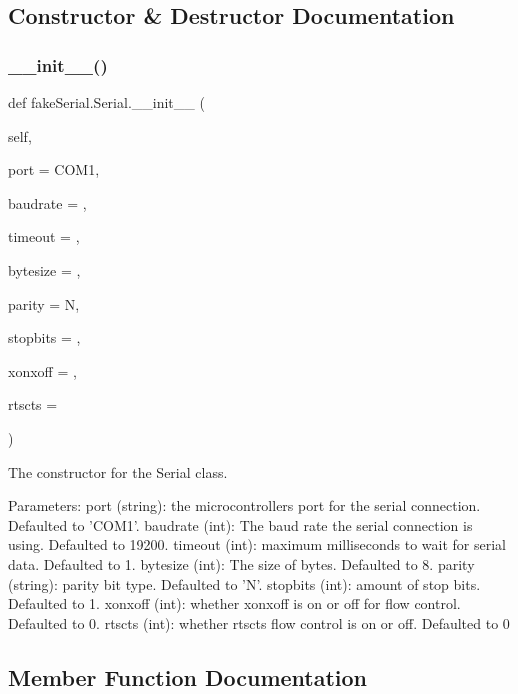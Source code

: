 \subsection{Constructor \& Destructor Documentation}
\mbox{\label{classfake_serial_1_1_serial_abcf3b27b5edb193420574f383ff1603c}} 
\subsubsection{\texorpdfstring{\_\_init\_\_()}{\_\_init\_\_()}}
{\footnotesize\ttfamily def fake\+Serial.\+Serial.\+\_\+\+\_\+init\+\_\+\+\_\+ (\begin{DoxyParamCaption}\item[{}]{self,  }\item[{}]{port = {\ttfamily \textquotesingle{}COM1\textquotesingle{}},  }\item[{}]{baudrate = {},  }\item[{}]{timeout = {},  }\item[{}]{bytesize = {},  }\item[{}]{parity = {\ttfamily \textquotesingle{}N\textquotesingle{}},  }\item[{}]{stopbits = {},  }\item[{}]{xonxoff = {},  }\item[{}]{rtscts = {} }\end{DoxyParamCaption})}

\begin{DoxyVerb}The constructor for the Serial class.

Parameters:
    port (string): the microcontrollers port for the serial connection. Defaulted to 'COM1'.
    baudrate (int): The baud rate the serial connection is using. Defaulted to 19200.
    timeout (int): maximum milliseconds to wait for serial data. Defaulted to 1.
    bytesize (int): The size of bytes. Defaulted to 8.
    parity (string): parity bit type. Defaulted to 'N'.
    stopbits (int): amount of stop bits. Defaulted to 1.
    xonxoff (int): whether xonxoff is on or off for flow control. Defaulted to 0.
    rtscts (int): whether rtscts flow control is on or off. Defaulted to 0
\end{DoxyVerb}
 

\subsection{Member Function Documentation}
\mbox{\label{classfake_serial_1_1_serial_a597b04385c851077ccc3363f4bfb32c1}} 
